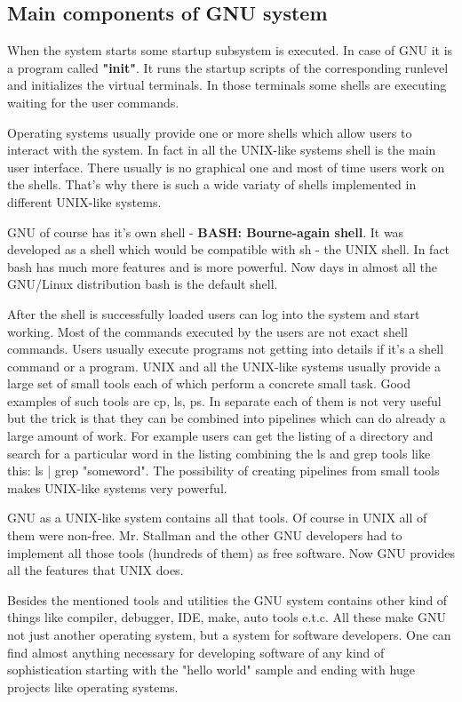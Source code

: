 \subsection{Main components of GNU system}

When the system starts some startup subsystem is executed. In case of GNU it is a program called \textbf{"init"}. It runs the startup scripts of the corresponding runlevel and initializes the virtual terminals. In those terminals some shells are executing waiting for the user commands.

Operating systems usually provide one or more shells which allow users to interact with the system. In fact in all the UNIX-like systems shell is the main user interface. There usually is no graphical one and most of time users work on the shells. That's why there is such a wide variaty of shells implemented in different UNIX-like systems.

GNU of course has it's own shell - \textbf {BASH: Bourne-again shell}. It was developed as a shell which would be compatible with sh - the UNIX shell. In fact bash has much more features and is more powerful. Now days in almost all the GNU/Linux distribution bash is the default shell.

After the shell is successfully loaded users can log into the system and start working. Most of the commands executed by the users are not exact shell commands. Users usually execute programs not getting into details if it's a shell command or a program. UNIX and all the UNIX-like systems usually provide a large set of small tools each of which perform a concrete small task. Good examples of such tools are cp, ls, ps. In separate each of them is not very useful but the trick is that they can be combined into pipelines which can do already a large amount of work. For example users can get the listing of a directory and search for a particular word in the listing combining the ls and grep tools like this: ls | grep "someword". The possibility of creating pipelines from small tools makes UNIX-like systems very powerful. 

GNU as a UNIX-like system contains all that tools. Of course in UNIX all of them were non-free. Mr. Stallman and the other GNU developers had to implement all those tools (hundreds of them) as free software. Now GNU provides all the 
features that UNIX does.

Besides the mentioned tools and utilities the GNU system contains other kind of things like compiler, debugger, IDE, make, auto tools e.t.c. All these make GNU not just another operating system, but a system for software developers. One can find almost anything necessary for developing software of any kind of sophistication starting with the "hello world" sample and ending with huge projects like operating systems.

